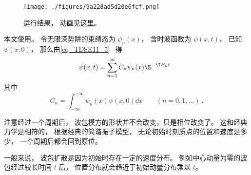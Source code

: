 

\begin{figure}[ht]
\centering
\texttt{[image: ./figures/9a228ad5d20e6fcf.png]}
\caption{运行结果， 动画见\href{https://wuli.wiki/apps/SHOgs.html}{这里}。} \label{fig_SHOgs_1}
\end{figure}

本文使用。 令无限深势阱的束缚态为 $\psi_n(x)$， 含时波函数为 $\psi(x, t)$， 已知 $\psi(x, 0)$， 那么由\autoref{eq_TDSE11_5}~ 得
\begin{equation}
\psi(x, t) = \sum_{n=1}^\infty C_n\psi_n(x)\E^{-\I E_n t}~.
\end{equation}
其中
\begin{equation}
C_n = \int_{-\infty}^{+\infty} \psi_n(x)\psi(x, 0) \dd{x} \qquad (n=0,1,\dots)~.
\end{equation}

注意经过一个周期后， 波包模方的形状并不会改变，只是相位改变了。 这和经典力学是相符的， 根据经典的简谐振子模型， 无论初始时刻质点的位置和速度是多少， 一个周期后都会回到原位。

一般来说， 波包扩散是因为初始时存在一定的速度分布。 例如中心动量为零的波包经过较长时间 $t$ 后， 位置分布就会趋近于初始动量分布乘以 $t$。

